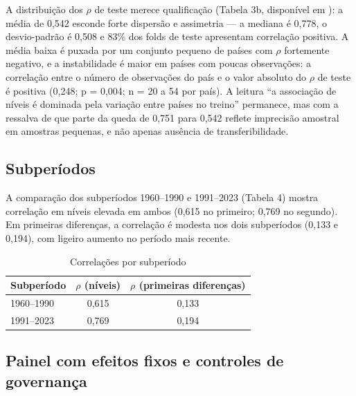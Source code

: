 \documentclass[12pt,a4paper]{article}
\begin{document}
A distribuição dos $\rho$ de teste merece qualificação (Tabela 3b, disponível em ): a média de 0,542 esconde forte dispersão e assimetria --- a mediana é 0,778, o desvio-padrão é 0,508 e 83\% dos folds de teste apresentam correlação positiva. A média baixa é puxada por um conjunto pequeno de países com $\rho$ fortemente negativo, e a instabilidade é maior em países com poucas observações: a correlação entre o número de observações do país e o valor absoluto do $\rho$ de teste é positiva (0,248; p = 0,004; n = 20 a 54 por país). A leitura ``a associação de níveis é dominada pela variação entre países no treino'' permanece, mas com a ressalva de que parte da queda de 0,751 para 0,542 reflete imprecisão amostral em amostras pequenas, e não apenas ausência de transferibilidade.

\subsection{Subperíodos}

A comparação dos subperíodos 1960--1990 e 1991--2023 (Tabela 4) mostra correlação em níveis elevada em ambos (0,615 no primeiro; 0,769 no segundo). Em primeiras diferenças, a correlação é modesta nos dois subperíodos (0,133 e 0,194), com ligeiro aumento no período mais recente.

\begin{table}[htbp]
\centering
\caption{Correlações por subperíodo}
\label{tab:subperiodos}
\small
\begin{tabular}{lcc}
\toprule
Subperíodo & $\rho$ (níveis) & $\rho$ (primeiras diferenças) \\
\midrule
1960--1990 & 0,615 & 0,133 \\
1991--2023 & 0,769 & 0,194 \\
\bottomrule
\end{tabular}
\par{}
\end{table}

\subsection{Painel com efeitos fixos e controles de governança}
\end{document}
